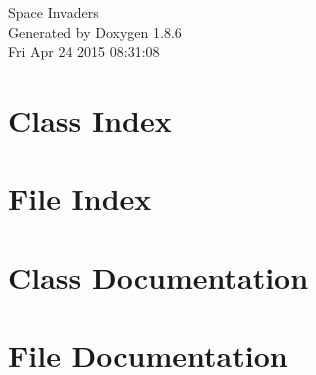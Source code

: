 \documentclass[twoside]{book}
\newcommand{\clearemptydoublepage}{%
  \newpage{\pagestyle{empty}\cleardoublepage}%
}
\begin{document}
\hypersetup{pageanchor=false}
\begin{titlepage}
\vspace*{7cm}
\begin{center}%
{\Large Space Invaders }\\
\vspace*{1cm}
{\large Generated by Doxygen 1.8.6}\\
\vspace*{0.5cm}
{\small Fri Apr 24 2015 08:31:08}\\
\end{center}
\end{titlepage}
\clearemptydoublepage
\tableofcontents
\clearemptydoublepage
{}
\hypersetup{pageanchor=true}

\chapter{Class Index}

\chapter{File Index}

\chapter{Class Documentation}



















\chapter{File Documentation}

















































\newpage
{}
{}
\printindex
\end{document}
